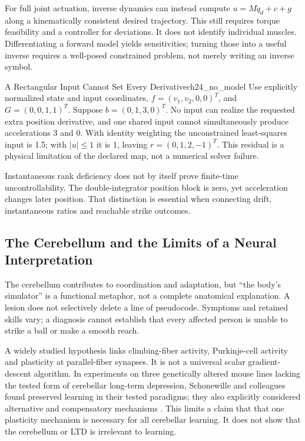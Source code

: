 For full joint actuation, inverse dynamics can instead compute $u=M\ddot q_d+c+g$ along a kinematically consistent desired trajectory. This still requires torque feasibility and a controller for deviations. It does not identify individual muscles. Differentiating a forward model yields sensitivities; turning those into a useful inverse requires a well-posed constrained problem, not merely writing an inverse symbol.

\begin{example}{A Rectangular Input Cannot Set Every Derivative}{ch24_no_model}
Use explicitly normalized state and input coordinates, $f=(v_1,v_2,0,0)^T$, and $G=(0,0,1,1)^T$. Suppose $b=(0,1,3,0)^T$. No input can realize the requested extra position derivative, and one shared input cannot simultaneously produce accelerations 3 and 0. With identity weighting the unconstrained least-squares input is 1.5; with $|u|\leq1$ it is 1, leaving $r=(0,1,2,-1)^T$. This residual is a physical limitation of the declared map, not a numerical solver failure.

Instantaneous rank deficiency does not by itself prove finite-time uncontrollability. The double-integrator position block is zero, yet acceleration changes later position. That distinction is essential when connecting drift, instantaneous ratios and reachable strike outcomes.
\end{example}
\label{subsec:ch24_why_models_matter}

\subsection{The Cerebellum and the Limits of a Neural Interpretation}
\label{subsec:ch24_cerebellum}
\label{princ:box:ch24_cerebellum_arch}
The cerebellum contributes to coordination and adaptation, but ``the body's simulator'' is a functional metaphor, not a complete anatomical explanation. A lesion does not selectively delete a line of pseudocode. Symptoms and retained skills vary; a diagnosis cannot establish that every affected person is unable to strike a ball or make a smooth reach.

A widely studied hypothesis links climbing-fiber activity, Purkinje-cell activity and plasticity at parallel-fiber synapses. It is not a universal scalar gradient-descent algorithm. In experiments on three genetically altered mouse lines lacking the tested form of cerebellar long-term depression, Schonewille and colleagues found preserved learning in their tested paradigms; they also explicitly considered alternative and compensatory mechanisms \citep{schonewille2011ltd}. This limits a claim that that one plasticity mechanism is necessary for all cerebellar learning. It does not show that the cerebellum or LTD is irrelevant to learning.

